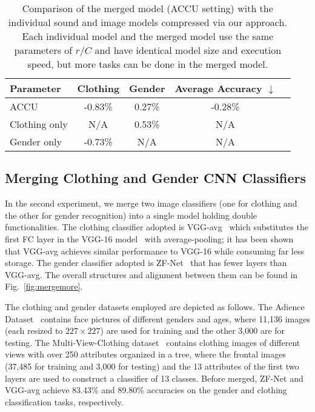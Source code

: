 \documentclass{article}
\begin{document}
	
	\begin{table}[pt]
		\small
		\centering
		\caption{Comparison of the merged model (ACCU setting) with the individual sound and image models compressed via our approach. Each individual model and the merged model use the same parameters of $r/C$ and have identical model size and execution speed, but more tasks can be done in the merged model.}
		\label{Ex2MergeOrSingle}
		\begin{tabular}{lcccc}
			\toprule
			Parameter            & Clothing  & Gender  & Average Accuracy $\downarrow$    \\ \hline
			ACCU                &  -0.83\%           & 0.27\%     & -0.28\%             \\ \hline
			Clothing only           & N/A              & 0.53\%         & N/A                          \\     
			Gender only           & -0.73\%           & N/A              & N/A                          \\
			\bottomrule
		\end{tabular}
	\end{table}
	
	
	
	
	\subsection*{Merging Clothing and Gender CNN Classifiers}
	In the second experiment, we merge two image classifiers (one for clothing and the other for gender recognition) into a single model holding double functionalities.
	The clothing classifier adopted is VGG-avg~\cite{yang2018supervised} which substitutes the first FC layer in the VGG-16 model~\cite{simonyan2014very} with average-pooling; it has been shown that VGG-avg achieves similar performance to VGG-16 while consuming far less storage.
	The gender classifier adopted is ZF-Net~\cite{ZFNet} that has fewer layers than VGG-avg.
	The overall structures and alignment between them can be found in Fig.~\ref{fig:mergemore}.
	
	The clothing and gender datasets employed are depicted as follows.
	The Adience Dataset~\cite{eidinger2014age} contains face pictures of different genders and ages, where 11,136 images (each resized to $227 \times 227$) are used for training and the other 3,000 are for testing.
	The Multi-View-Clothing dataset~\cite{DBLP:conf/mir/LiuCC16} contains clothing images of different views with over 250 attributes organized in a tree, where the frontal images (37,485 for training and 3,000 for testing) and the 13 attributes of the first two layers are used to construct a classifier of 13 classes.
	Before merged, ZF-Net and VGG-avg achieve 83.43\% and 89.80\% accuracies on the gender and clothing classification tasks, respectively.
	
\end{document}
